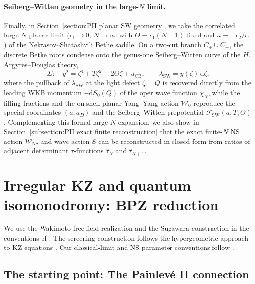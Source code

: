 \documentclass[a4paper,11pt]{article}
\newcommand{\dd}{\mathrm{d}}
\numberwithin{equation}{section}
\begin{document}
\paragraph{Seiberg--Witten geometry in the large-$N$ limit.}
Finally, in Section~\ref{section:PII planar SW geometry}, we take the correlated large-$N$ planar limit ($\epsilon_{1}\to 0$, $N\to\infty$ with $\Theta=\epsilon_{1}(N-1)$ fixed and $\kappa=-\epsilon_{2}/\epsilon_{1}$) of the Nekrasov--Shatashvili Bethe saddle.  On a two-cut branch $C_{+}\cup C_{-}$, the discrete Bethe roots condense onto the genus-one Seiberg--Witten curve of the $H_{1}$ Argyres--Douglas theory,
\begin{equation}
	\Sigma:\quad y^{2}=\zeta^{4}+T\zeta^{2}-2\Theta\zeta+u_{\mathrm{CB}},
	\qquad
	\lambda_{\mathrm{SW}}=y(\zeta)\,\dd\zeta,
\end{equation}
where the pullback of $\lambda_{\mathrm{SW}}$ at the light defect $\zeta=Q$ is recovered directly from the leading WKB momentum $-\dd S_{0}(Q)$ of the oper wave function $\chi_{N}$, while the filling fractions and the on-shell planar Yang--Yang action $\mathcal{W}_{0}$ reproduce the special coordinates $(a,a_{D})$ and the Seiberg--Witten prepotential $\mathcal{F}_{\mathrm{SW}}(a,T,\Theta)$.  Complementing this formal large-$N$ expansion, we also show in Section~\ref{subsection:PII exact finite reconstruction} that the exact finite-$N$ NS action $\mathcal{W}_{\mathrm{NS}}$ and wave action $S$ can be reconstructed in closed form from ratios of adjacent determinant $\tau$-functions $\widehat{\tau}_{N}$ and $\widehat{\tau}_{N+1}$.

\section{Irregular KZ and quantum isomonodromy: BPZ reduction}
\label{section:PII affine BPZ}

We use the Wakimoto free-field realization and the Sugawara
construction in the conventions of
\cite[Lectures~2 and~5]{EtingofFrenkelKirillov1998}.
The screening construction follows the hypergeometric approach to
KZ equations \cite{SchechtmanVarchenko1990,Kohno2014}.
Our classical-limit and NS parameter conventions follow
\cite{FrenkelGukovTeschner2015,NekrasovShatashvili2009}.
\subsection{The starting point: The Painlev\'e II connection}
\end{document}
